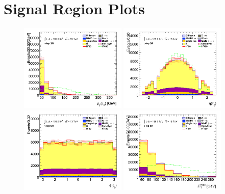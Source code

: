 		\clearpage
	\section{\taulep Signal Region Plots}\label{sec:taulep-sr-plots}
		\clearpage
		\begin{figure}[!htp]
			\begin{center}    
			\includegraphics[width=0.45\textwidth]{chapters/chapter6_HPlus/images/taulep/tau_0_pt_SR_TAULEP.png}
			\includegraphics[width=0.45\textwidth]{chapters/chapter6_HPlus/images/taulep/tau_0_eta_SR_TAULEP.png} \\
			\includegraphics[width=0.45\textwidth]{chapters/chapter6_HPlus/images/taulep/tau_0_phi_SR_TAULEP.png}
			\includegraphics[width=0.45\textwidth]{chapters/chapter6_HPlus/images/taulep/met_et_SR_TAULEP.png} \\

\end{center}
\end{figure}
